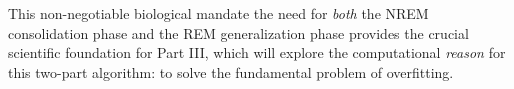 This non-negotiable biological mandate \- the need for \textit{both} the NREM consolidation phase and the REM generalization phase \- provides the crucial scientific foundation for Part III, which will explore the computational \textit{reason} for this two-part algorithm: to solve the fundamental problem of overfitting.
